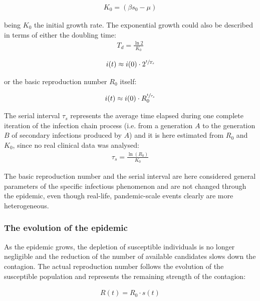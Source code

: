 \documentclass[DIV=12, BCOR=0pt]{scrartcl}  %
\begin{document}
  \begin{align} %
  	K_0 = (\beta s_0 - \mu)
  	\label{eq:sir_K0}
  \end{align}
	
	being $K_0$ the initial growth rate. The exponential growth could also be described in terms of either the doubling time:
	\begin{align}
		T_{d} = \frac{\ln 2}{K_0}
		\label{eq:doubling} 
	\end{align}

	\begin{align}
		i(t) \approx i(0) \cdot 2^{\sfrac{t}{T_{d}}}
		\label{eq:sir_growthTd} 
	\end{align}

	or the basic reproduction number $R_0$ itself:
	
	\begin{align}
		i(t) \approx i(0) \cdot R_0^{\sfrac{t}{\tau_s}}
		\label{eq:sir_growthR0}
	\end{align}

The serial interval $\tau_s$ represents the average time elapsed during one complete iteration of the infection chain process (i.e. from a generation $A$ to the generation $B$ of secondary infections produced by $A$) and it is here estimated from $R_0$ and $K_0$, since no real clinical data was analysed: 
	\begin{align}
		\tau_s = \frac{\ln(R_0)}{K_0}
		\label{eq:serial}
	\end{align}

The basic reproduction number and the serial interval are here considered general parameters of the specific infectious phenomenon and are not changed through the epidemic, even though real-life, pandemic-scale events clearly are more heterogeneous.  

  \subsubsection{The evolution of the epidemic}
  As the epidemic grows, the depletion of susceptible individuals is no longer negligible and the reduction of the number of available candidates slows down the contagion.
  The actual reproduction number follows the evolution of the susceptible population and represents the remaining strength of the contagion:
  
  \begin{align}
		R(t) = R_0 \cdot s(t) 
		\label{eq:Rt}
  \end{align}
\end{document}

